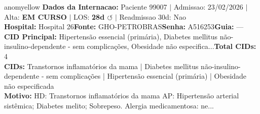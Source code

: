 \documentclass[a4paper,10pt]{article}
\begin{document}
\begin{anomalycard}[Internacao 166300 | GHO-PETROBRAS | MODERADO (z=2.48)]{anomyellow}
\textbf{Dados da Internacao:} Paciente 99007 $\mid$ Admissao: 23/02/2026 $\mid$ Alta: \textcolor{anomorange}{\textbf{EM CURSO}} $\mid$ LOS: \textbf{28d \textcolor{anomorange}{$\circlearrowleft$}} $\mid$ Readmissao 30d: Nao\\
\textbf{Hospital:} Hospital 26\quad\textbf{Fonte:} GHO-PETROBRAS\quad\textbf{Senha:} A516253\quad\textbf{Guia:} ---\\
\textbf{CID Principal:} {\small Hipertensão essencial (primária), Diabetes mellitus não-insulino-dependente - sem complicações, Obesidade não especifica...}\quad\textbf{Total CIDs:} 4\\

\textbf{CIDs:} {\scriptsize Transtornos inflamatórios da mama | Diabetes mellitus não-insulino-dependente - sem complicações | Hipertensão essencial (primária) | Obesidade não especificada}\\

\textbf{Motivo:} {\scriptsize HD: Transtornos inflamatórios da mama  AP: Hipertensão arterial sistêmica; Diabetes melito; Sobrepeso. Alergia medicamentosa: ne...}\\


\end{anomalycard}
\end{document}
